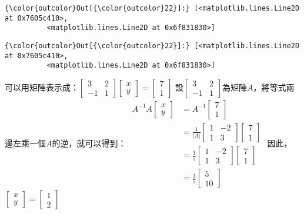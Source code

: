 \documentclass[11pt]{article}
\begin{document}
{\begin{Verbatim}[commandchars=\\\{\}]
{\color{outcolor}Out[{\color{outcolor}22}]:} [<matplotlib.lines.Line2D at 0x7605c410>,
          <matplotlib.lines.Line2D at 0x6f831830>]
\end{Verbatim}
            
\begin{Verbatim}[commandchars=\\\{\}]
{\color{outcolor}Out[{\color{outcolor}22}]:} [<matplotlib.lines.Line2D at 0x7605c410>,
          <matplotlib.lines.Line2D at 0x6f831830>]
\end{Verbatim}
            
    可以用矩陣表示成：\(\begin{bmatrix} 3 & 2 \\ -1 & 1 \end{bmatrix} \begin{bmatrix} x \\ y \end{bmatrix} = \begin{bmatrix} 7\\ 1 \end{bmatrix}\)
設\(\begin{bmatrix}3 & 2 \\-1 & 1\end{bmatrix}\)為矩陣\(A\)，將等式兩邊左乘一個\(A\)的逆，就可以得到：
\(\begin{aligned} A^{-1}A \begin{bmatrix} x \\ y \end{bmatrix} &= A^{-1} \begin{bmatrix} 7\\ 1 \end{bmatrix}\\\
&= \frac{1}{|A|}\begin{bmatrix}1 & -2 \\ 1 & 3\end{bmatrix} \begin{bmatrix} 7\\ 1 \end{bmatrix}\\\
&= \frac{1}{5}\begin{bmatrix}1 & -2 \\ 1 & 3\end{bmatrix} \begin{bmatrix} 7\\ 1 \end{bmatrix}\\\
&= \frac{1}{5}\begin{bmatrix}5 \\ 10\end{bmatrix} \end{aligned}\)
因此，\(\begin{bmatrix}x \\ y\end{bmatrix}=\begin{bmatrix}1 \\ 2\end{bmatrix}\)

}
\end{document}
